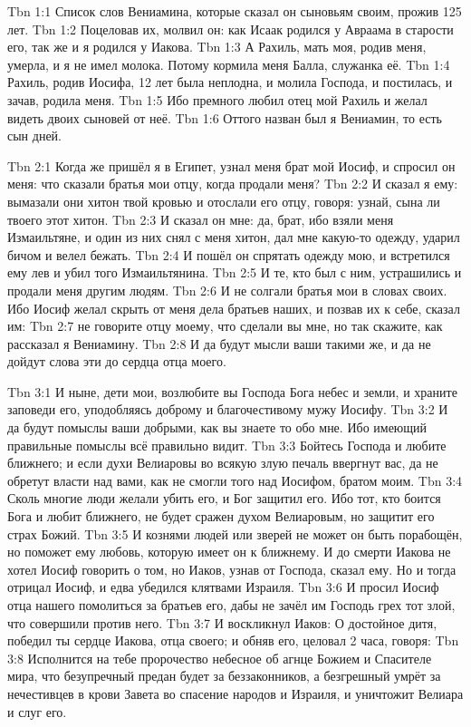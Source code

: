 \vs Tbn 1:1
Список слов Вениамина, которые сказал он сыновьям своим,
прожив 125 лет.
\vs Tbn 1:2
Поцеловав их, молвил он:
как Исаак родился у Авраама в старости его,
так же и я родился у Иакова.
\vs Tbn 1:3
А Рахиль, мать моя, родив меня, умерла, и я не имел молока.
Потому кормила меня Балла, служанка её.
\vs Tbn 1:4
Рахиль, родив Иосифа, 12 лет была неплодна,
и молила Господа, и постилась, и зачав, родила меня.
\vs Tbn 1:5
Ибо премного любил отец мой Рахиль
и желал видеть двоих сыновей от неё.
\vs Tbn 1:6
Оттого назван был я Вениамин, то есть сын дней.

\vs Tbn 2:1
Когда же пришёл я в Египет, узнал меня брат мой Иосиф,
и спросил он меня: что сказали братья мои отцу,
когда продали меня?
\vs Tbn 2:2
И сказал я ему:
вымазали они хитон твой кровью и отослали его отцу, говоря:
узнай, сына ли твоего этот хитон.
\vs Tbn 2:3
И сказал он мне: да, брат, ибо взяли меня Измаильтяне,
и один из них снял с меня хитон, дал мне какую-то одежду,
ударил бичом и велел бежать.
\vs Tbn 2:4
И пошёл он спрятать одежду мою,
и встретился ему лев и убил того Измаильтянина.
\vs Tbn 2:5
И те, кто был с ним, устрашились и продали меня другим людям.
\vs Tbn 2:6
И не солгали братья мои в словах своих.
Ибо Иосиф желал скрыть от меня дела братьев наших,
и позвав их к себе, сказал им:
\vs Tbn 2:7
не говорите отцу моему, что сделали вы мне,
но так скажите, как рассказал я Вениамину.
\vs Tbn 2:8
И да будут мысли ваши такими же,
и да не дойдут слова эти до сердца отца моего.

\vs Tbn 3:1
И ныне, дети мои, возлюбите вы Господа Бога небес и земли,
и храните заповеди его, уподобляясь доброму и благочестивому
мужу Иосифу.
\vs Tbn 3:2
И да будут помыслы ваши добрыми,
как вы знаете то обо мне.
Ибо имеющий правильные помыслы всё правильно видит.
\vs Tbn 3:3
Бойтесь Господа и любите ближнего;
и если духи Велиаровы во всякую злую печаль ввергнут вас,
да не обретут власти над вами, как не смогли того над Иосифом,
братом моим.
\vs Tbn 3:4
Сколь многие люди желали убить его, и Бог защитил его.
Ибо тот, кто боится Бога и любит ближнего,
не будет сражен духом Велиаровым,
но защитит его страх Божий.
\vs Tbn 3:5
И кознями людей или зверей не может он быть порабощён,
но поможет ему любовь, которую имеет он к ближнему.
И до смерти Иакова не хотел Иосиф говорить о том,
но Иаков, узнав от Господа, сказал ему.
Но и тогда отрицал Иосиф, и едва убедился клятвами Израиля.
\vs Tbn 3:6
И просил Иосиф отца нашего помолиться за братьев его,
дабы не зачёл им Господь грех тот злой,
что совершили против него.
\vs Tbn 3:7
И воскликнул Иаков: О достойное дитя,
победил ты сердце Иакова, отца своего;
и обняв его, целовал 2 часа, говоря:
\vs Tbn 3:8
Исполнится на тебе пророчество небесное об агнце Божием
и Спасителе мира, что безупречный предан будет за беззаконников,
а безгрешный умрёт за нечестивцев в крови Завета во спасение народов
и Израиля, и уничтожит Велиара и слуг его.


